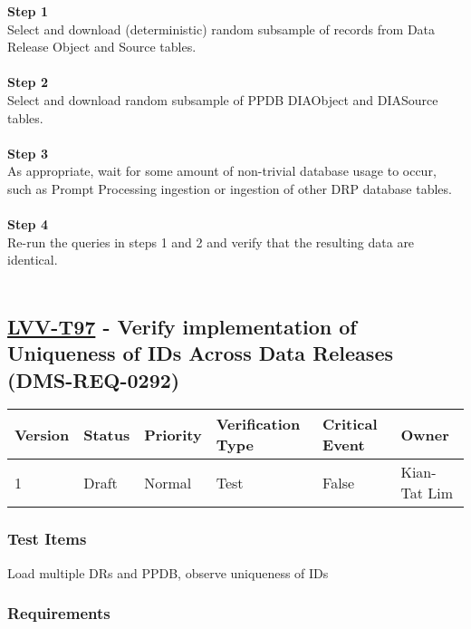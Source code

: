 \textbf{Step 1}\\
Select and download (deterministic) random subsample of records from
Data Release Object and Source tables.\\
~\\
\textbf{Step 2}\\
Select and download random subsample of PPDB DIAObject and DIASource
tables.\\
~\\
\textbf{Step 3}\\
As appropriate, wait for some amount of non-trivial database usage to
occur, such as Prompt Processing ingestion or ingestion of other DRP
database tables.\\
~\\
\textbf{Step 4}\\
Re-run the queries in steps 1 and 2 and verify that the resulting data
are identical.\\
~\\

\hypertarget{lvv-t97---verify-implementation-of-uniqueness-of-ids-across-data-releases-dms-req-0292}{%
\subsection{\texorpdfstring{\href{https://jira.lsstcorp.org/secure/Tests.jspa\#/testCase/LVV-T97}{LVV-T97}
- Verify implementation of Uniqueness of IDs Across Data Releases
(DMS-REQ-0292)}{LVV-T97 - Verify implementation of Uniqueness of IDs Across Data Releases (DMS-REQ-0292)}}\label{lvv-t97---verify-implementation-of-uniqueness-of-ids-across-data-releases-dms-req-0292}}

\begin{longtable}[]{@{}llllll@{}}
\toprule
Version & Status & Priority & Verification Type & Critical Event &
Owner\tabularnewline
\midrule
\endhead
1 & Draft & Normal & Test & False & Kian-Tat Lim\tabularnewline
\bottomrule
\end{longtable}

\hypertarget{test-items-73}{%
\subsubsection{Test Items}\label{test-items-73}}

Load multiple DRs and PPDB, observe uniqueness of IDs

\hypertarget{requirements-74}{%
\subsubsection{Requirements}\label{requirements-74}}

